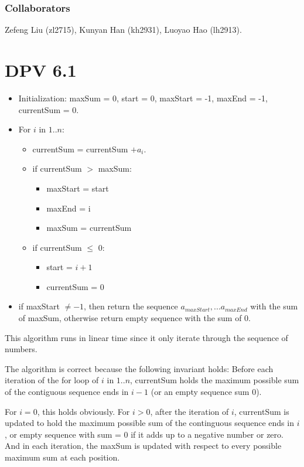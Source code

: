 \documentclass[twoside]{homework}
\begin{document}
\maketitle
\subsubsection*{Collaborators}
Zefeng Liu (zl2715), Kunyan Han (kh2931), Luoyao Hao (lh2913).

\section{DPV 6.1}
\begin{itemize}
	\item Initialization: maxSum = 0, start = 0, maxStart = -1, maxEnd = -1, currentSum = 0.
	\item For $i$ in $1..n$:
		\begin{itemize}
			\item currentSum = currentSum $+ a_i$.
			\item if currentSum $>$ maxSum:
				\begin{itemize}
					\item maxStart = start
					\item maxEnd = i
					\item maxSum = currentSum
				\end{itemize}
			\item if currentSum $\leq$ 0:
				\begin{itemize}
					\item start = $i+1$
					\item currentSum = 0
				\end{itemize}
		\end{itemize}
	\item if maxStart $\neq -1$, then return the sequence $a_{maxStart},... a_{maxEnd}$ with the sum of maxSum, otherwise return empty sequence with the sum of 0.
\end{itemize}

This algorithm runs in linear time since it only iterate through the sequence of numbers.

The algorithm is correct because the following invariant holds: Before each iteration of the for loop of $i$ in $1..n$, currentSum holds the maximum possible sum of the contiguous sequence ends in $i-1$ (or an empty sequence sum 0).

For $i=0$, this holds obviously. For $i>0$, after the iteration of $i$, currentSum is updated to hold the maximum possible sum of the continguous sequence ends in $i$, or empty sequence with sum = 0 if it adds up to a negative number or zero. And in each iteration, the maxSum is updated with respect to every possible maximum sum at each position.
\end{document}
